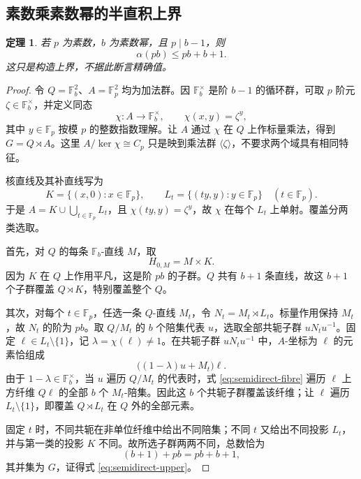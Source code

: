 \documentclass[11pt,a4paper]{article}
\numberwithin{equation}{section}
\theoremstyle{plain}
\newtheorem{theorem}{定理}[section]
\theoremstyle{definition}
\theoremstyle{remark}
\newcommand{\F}{\mathbb{F}}
\begin{document}
\subsection{素数乘素数幂的半直积上界}\label{sec:semidirect}
\begin{theorem}\label{thm:semidirect-upper}
若 $p$ 为素数，$b$ 为素数幂，且 $p\mid b-1$，则
\begin{equation}\label{eq:semidirect-upper}
 \boxed{\alpha(pb)\le pb+b+1.}
\end{equation}
这只是构造上界，不据此断言精确值。
\end{theorem}
\begin{proof}
令 $Q=\F_b^2$、$A=\F_p^2$ 均为加法群。因 $\F_b^\times$ 是阶 $b-1$ 的循环群，可取 $p$ 阶元 $\zeta\in\F_b^\times$，并定义同态
\begin{equation}
 \chi:A\longrightarrow\F_b^\times,\qquad \chi(x,y)=\zeta^y,
\end{equation}
其中 $y\in\F_p$ 按模 $p$ 的整数指数理解。让 $A$ 通过 $\chi$ 在 $Q$ 上作标量乘法，得到 $G=Q\rtimes A$。这里 $A/\ker\chi\cong C_p$ 只是映到乘法群 $\langle\zeta\rangle$，不要求两个域具有相同特征。

核直线及其补直线写为
\begin{equation}
 K=\{(x,0):x\in\F_p\},\qquad
 L_t=\{(ty,y):y\in\F_p\}\quad(t\in\F_p).
\end{equation}
于是 $A=K\cup\bigcup_{t\in\F_p}L_t$，且 $\chi(ty,y)=\zeta^y$，故 $\chi$ 在每个 $L_t$ 上单射。覆盖分两类选取。

首先，对 $Q$ 的每条 $\F_b$-直线 $M$，取
\begin{equation}
 H_{0,M}=M\times K.
\end{equation}
因为 $K$ 在 $Q$ 上作用平凡，这是阶 $pb$ 的子群。$Q$ 共有 $b+1$ 条直线，故这 $b+1$ 个子群覆盖 $Q\rtimes K$，特别覆盖整个 $Q$。

其次，对每个 $t\in\F_p$，任选一条 $Q$-直线 $M_t$，令 $N_t=M_t\rtimes L_t$。标量作用保持 $M_t$，故 $N_t$ 的阶为 $pb$。取 $Q/M_t$ 的 $b$ 个陪集代表 $u$，选取全部共轭子群 $uN_tu^{-1}$。固定 $\ell\in L_t\setminus\{1\}$，记 $\lambda=\chi(\ell)\ne1$。在共轭子群 $uN_tu^{-1}$ 中，$A$-坐标为 $\ell$ 的元素恰组成
\begin{equation}\label{eq:semidirect-fibre}
 \bigl((1-\lambda)u+M_t\bigr)\ell.
\end{equation}
由于 $1-\lambda\in\F_b^\times$，当 $u$ 遍历 $Q/M_t$ 的代表时，式 \eqref{eq:semidirect-fibre} 遍历 $\ell$ 上方纤维 $Q\ell$ 的全部 $b$ 个 $M_t$-陪集。因此这 $b$ 个共轭子群覆盖该纤维；让 $\ell$ 遍历 $L_t\setminus\{1\}$，即覆盖 $Q\rtimes L_t$ 在 $Q$ 外的全部元素。

固定 $t$ 时，不同共轭在非单位纤维中给出不同陪集；不同 $t$ 又给出不同投影 $L_t$，并与第一类的投影 $K$ 不同。故所选子群两两不同，总数恰为
\begin{equation}
 (b+1)+pb=pb+b+1,
\end{equation}
其并集为 $G$，证得式 \eqref{eq:semidirect-upper}。
\end{proof}
\end{document}
